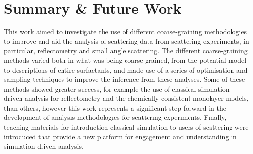
\chapter{Summary \& Future Work} %

\label{summary} %


This work aimed to investigate the use of different coarse-graining methodologies to improve and aid the analysis of scattering data from scattering experiments, in particular, reflectometry and small angle scattering.
The different coarse-graining methods varied both in what was being coarse-grained, from the potential model to descriptions of entire surfactants, and made use of a series of optimisation and sampling techniques to improve the inference from these analyses.
Some of these methods showed greater success, for example the use of classical simulation-driven analysis for reflectometry and the chemically-consistent monolayer models, than others, however this work represents a significant step forward in the development of analysis methodologies for scattering experiments.
Finally, teaching materials for introduction classical simulation to users of scattering were introduced that provide a new platform for engagement and understanding in simulation-driven analysis.

